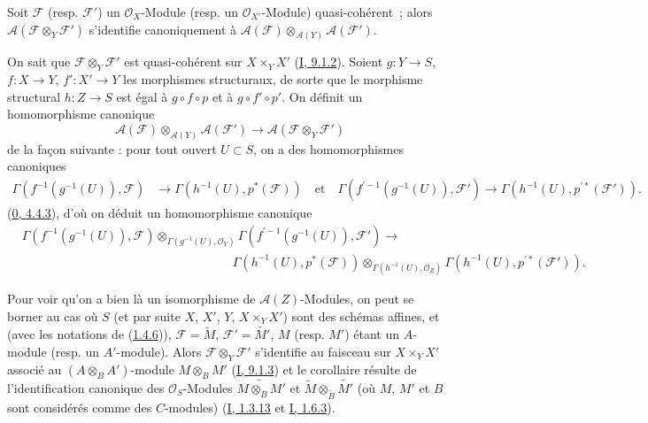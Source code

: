 \begin{corollary}[1.4.7]
\label{II.1.4.7-fr}
Soit $\mathcal{F}$ (resp. $\mathcal{F}'$) un $\mathcal{O}_X$-Module (resp. un
$\mathcal{O}_{X'}$-Module) quasi-cohérent~; alors
$\mathcal{A}(\mathcal{F}\otimes_Y\mathcal{F}')$ s'identifie canoniquement à
$\mathcal{A}(\mathcal{F})\otimes_{\mathcal{A}(Y)}
\mathcal{A}(\mathcal{F}')$.
\end{corollary}

On sait que $\mathcal{F}\otimes_Y\mathcal{F}'$ est quasi-cohérent sur
$X\times_Y X'$ (\hyperref[I.9.1.2-fr]{I, 9.1.2}). Soient $g:Y\to S$,
$f:X\to Y$, $f':X'\to Y$ les morphismes structuraux, de sorte que le
morphisme structural
$h:Z\to S$ est égal à $g\circ f\circ p$ et à $g\circ f'\circ p'$. On
définit un homomorphisme canonique
\[
  \mathcal{A}(\mathcal{F})\otimes_{\mathcal{A}(Y)}\mathcal{A}(\mathcal{F}')
  \longrightarrow \mathcal{A}(\mathcal{F}\otimes_Y\mathcal{F}')
\]
de la façon suivante : pour tout ouvert $U\subset S$, on a des homomorphismes
canoniques
\[
  \begin{aligned}
  \Gamma(f^{-1}(g^{-1}(U)),\mathcal{F})
  &\longrightarrow \Gamma(h^{-1}(U),p^*(\mathcal{F}))\quad\text{et}\quad
  \Gamma(f^{\prime-1}(g^{-1}(U)),\mathcal{F}')
  \longrightarrow \Gamma(h^{-1}(U),p^{\prime*}(\mathcal{F}')).
  \end{aligned}
\]
(\hyperref[0.4.4.3-fr]{0, 4.4.3}), d'où on déduit un homomorphisme canonique
\[
  \begin{aligned}
  &\Gamma(f^{-1}(g^{-1}(U)),\mathcal{F})
    \otimes_{\Gamma(g^{-1}(U),\mathcal{O}_Y)}
    \Gamma(f^{\prime-1}(g^{-1}(U)),\mathcal{F}')\longrightarrow\\
  &\hspace{17em}
    \Gamma(h^{-1}(U),p^*(\mathcal{F}))
    \otimes_{\Gamma(h^{-1}(U),\mathcal{O}_Z)}
    \Gamma(h^{-1}(U),p^{\prime*}(\mathcal{F}')).
  \end{aligned}
\]

Pour voir qu'on a bien là un isomorphisme de $\mathcal{A}(Z)$-Modules, on
peut se borner au cas où $S$ (et par suite $X$, $X'$, $Y$,
$X\times_Y X'$) sont des schémas affines, et (avec les notations de
(\hyperref[II.1.4.6-fr]{1.4.6})), $\mathcal{F}=\widetilde{M}$,
$\mathcal{F}'=\widetilde{M'}$, $M$ (resp. $M'$) étant un $A$-module (resp. un
$A'$-module). Alors $\mathcal{F}\otimes_Y\mathcal{F}'$ s'identifie au
faisceau sur $X\times_Y X'$ associé au $(A\otimes_B A')$-module
$M\otimes_B M'$ (\hyperref[I.9.1.3-fr]{I, 9.1.3}) et le corollaire résulte de
l'identification canonique des $\mathcal{O}_S$-Modules
$\widetilde{M\otimes_B M'}$ et
$\widetilde{M}\otimes_{\widetilde{B}}\widetilde{M'}$ (où $M$, $M'$ et $B$
sont considérés comme des $C$-modules)
(\hyperref[I.1.3.13-fr]{I, 1.3.13} et
\hyperref[I.1.6.3-fr]{I, 1.6.3}).

